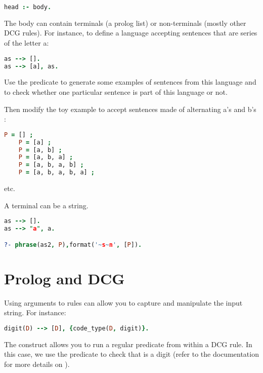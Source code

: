 \documentclass{../../../tp}
\begin{document}
\begin{lstlisting}[language=prolog]
head :- body.
\end{lstlisting}

The body can contain terminals (a prolog list) or non-terminals (mostly other DCG rules). For instance, to define a language accepting sentences that are series of the letter a:

\begin{lstlisting}[language=prolog]
as --> [].
as --> [a], as.
\end{lstlisting}

\begin{instruction}
	Use the  predicate to generate some examples of sentences from this language and to check whether one particular sentence is part of this language or not.
	
	Then modify the toy example to accept sentences made of alternating a's and b's :
	\begin{lstlisting}[language=prolog]
	P = [] ;
	P = [a] ;
	P = [a, b] ;
	P = [a, b, a] ;
	P = [a, b, a, b] ;
	P = [a, b, a, b, a] ;
	\end{lstlisting}
	etc.
\end{instruction}

A terminal can be a string. 
\begin{lstlisting}[language=prolog]
as --> [].
as --> "a", a.

?- phrase(as2, P),format('~s~n', [P]).
\end{lstlisting}



\section{Prolog and DCG}

Using arguments to rules can allow you to capture and manipulate the input string. For instance:
\begin{lstlisting}[language=prolog]
digit(D) --> [D], {code_type(D, digit)}.
\end{lstlisting}

The  construct allows you to run a regular \prolog predicate from within a DCG rule. In this case, we use the  predicate to check that  is a digit (refer to the documentation for more details on ).
\end{document}
